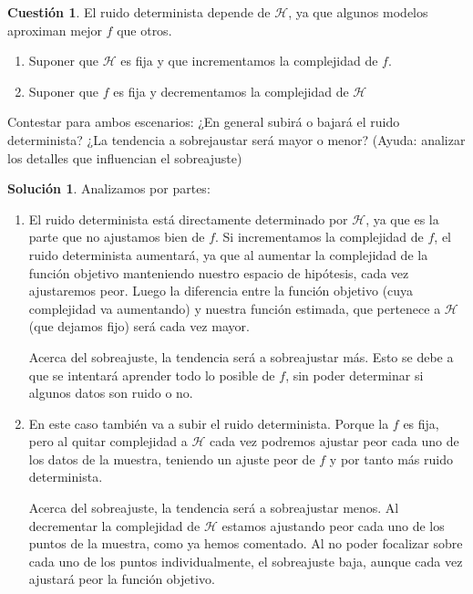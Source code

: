\documentclass[a4paper, 11pt]{article}
\theoremstyle{definition}
\newtheorem{cuestion}{Cuestión}
\newtheorem*{solucion}{Solución}
\begin{document}
  \begin{cuestion}
    El ruido determinista depende de $\mathcal{H}$, ya que algunos modelos aproximan mejor $f$ que otros.
    \begin{enumerate}
        \item Suponer que $\mathcal{H}$ es fija y que incrementamos la complejidad de $f$.
        \item Suponer que $f$ es fija y decrementamos la complejidad de $\mathcal{H}$
    \end{enumerate}
    Contestar para ambos escenarios: ¿En general subirá o bajará el ruido determinista? ¿La tendencia a sobrejaustar será mayor o menor? (Ayuda: analizar los detalles que influencian el sobreajuste)
  \end{cuestion}

  \begin{solucion}
    Analizamos por partes:
    \begin{enumerate}
      \item El ruido determinista está directamente determinado por $\mathcal{H}$, ya que es la parte que no ajustamos bien de $f$. Si incrementamos la complejidad de $f$, el ruido determinista aumentará, ya que al aumentar la complejidad de la función objetivo manteniendo nuestro espacio de hipótesis, cada vez ajustaremos peor. Luego la diferencia entre la función objetivo (cuya complejidad va aumentando) y nuestra función estimada, que pertenece a $\mathcal{H}$ (que dejamos fijo) será cada vez mayor.

      Acerca del sobreajuste, la tendencia será a sobreajustar más. Esto se debe a que se intentará aprender todo lo posible de $f$, sin poder determinar si algunos datos son ruido o no. 
      \item En este caso también va a subir el ruido determinista. Porque la $f$ es fija, pero al quitar complejidad a $\mathcal{H}$ cada vez podremos ajustar peor cada uno de los datos de la muestra, teniendo un ajuste peor de $f$ y por tanto más ruido determinista.

      Acerca del sobreajuste, la tendencia será a sobreajustar menos. Al decrementar la complejidad de $\mathcal{H}$ estamos ajustando peor cada uno de los puntos de la muestra, como ya hemos comentado. Al no poder focalizar sobre cada uno de los puntos individualmente, el sobreajuste baja, aunque cada vez ajustará peor la función objetivo.
    \end{enumerate}
  \end{solucion}
\end{document}
